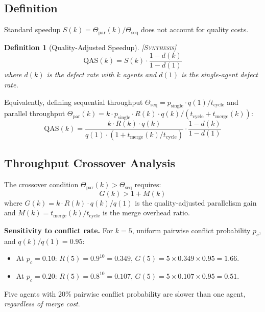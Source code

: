\documentclass[11pt, a4paper, logo, copyright]{googledeepmind}
\newtheorem{definition}{Definition}[section]
\newcommand{\synthesis}{\textsc{[Synthesis]}}
\begin{document}
\subsection{Definition}

Standard speedup $S(k) = \Theta_{\mathrm{par}}(k) / \Theta_{\mathrm{seq}}$ does not account for quality costs.

\begin{definition}[Quality-Adjusted Speedup] \synthesis{}
\label{def:qas}
\begin{equation}
\label{eq:qas}
  \mathrm{QAS}(k) = S(k) \cdot \frac{1 - d(k)}{1 - d(1)}
\end{equation}
where $d(k)$ is the defect rate with $k$ agents and $d(1)$ is the single-agent defect rate.
\end{definition}

Equivalently, defining sequential throughput $\Theta_{\mathrm{seq}} = p_{\mathrm{single}} \cdot q(1) / t_{\mathrm{cycle}}$ and parallel throughput $\Theta_{\mathrm{par}}(k) = k \cdot p_{\mathrm{single}} \cdot R(k) \cdot q(k) / (t_{\mathrm{cycle}} + t_{\mathrm{merge}}(k))$:
\begin{equation}
  \mathrm{QAS}(k) = \frac{k \cdot R(k) \cdot q(k)}{q(1) \cdot (1 + t_{\mathrm{merge}}(k)/t_{\mathrm{cycle}})} \cdot \frac{1 - d(k)}{1 - d(1)}
\end{equation}

\subsection{Throughput Crossover Analysis}

The crossover condition $\Theta_{\mathrm{par}}(k) > \Theta_{\mathrm{seq}}$ requires:
\begin{equation}
  G(k) > 1 + M(k)
\end{equation}
where $G(k) = k \cdot R(k) \cdot q(k)/q(1)$ is the quality-adjusted parallelism gain and $M(k) = t_{\mathrm{merge}}(k)/t_{\mathrm{cycle}}$ is the merge overhead ratio.

\textbf{Sensitivity to conflict rate.}
For $k = 5$, uniform pairwise conflict probability $p_c$, and $q(k)/q(1) = 0.95$:
\begin{itemize}[nosep]
  \item At $p_c = 0.10$: $R(5) = 0.9^{10} = 0.349$, $G(5) = 5 \times 0.349 \times 0.95 = 1.66$.
  \item At $p_c = 0.20$: $R(5) = 0.8^{10} = 0.107$, $G(5) = 5 \times 0.107 \times 0.95 = 0.51$.
\end{itemize}
Five agents with 20\% pairwise conflict probability are slower than one agent, \emph{regardless of merge cost}.
\end{document}
